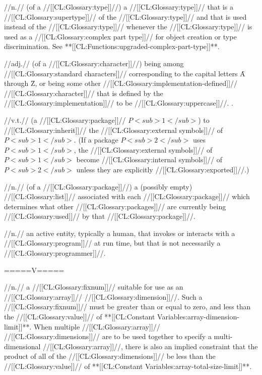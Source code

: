  //n.// (of a //[[CL:Glossary:type]]//) a //[[CL:Glossary:type]]// that is a //[[CL:Glossary:supertype]]// of the //[[CL:Glossary:type]]// and that is used instead of the //[[CL:Glossary:type]]// whenever the //[[CL:Glossary:type]]// is used as a //[[CL:Glossary:complex part type]]// for object creation or type discrimination. See **[[CL:Functions:upgraded-complex-part-type]]**.

 //adj.// (of a //[[CL:Glossary:character]]//) being among //[[CL:Glossary:standard characters]]// corresponding to the capital letters \f{A} through \f{Z}, or being some other //[[CL:Glossary:implementation-defined]]// //[[CL:Glossary:character]]// that is defined by the //[[CL:Glossary:implementation]]// to be //[[CL:Glossary:uppercase]]//. \Seesection\CharactersWithCase.

 //v.t.// (a //[[CL:Glossary:package]]// $P<sub>1</sub>$) to //[[CL:Glossary:inherit]]// the //[[CL:Glossary:external symbols]]// of $P<sub>1</sub>$. (If a package $P<sub>2</sub>$ uses $P<sub>1</sub>$, the //[[CL:Glossary:external symbols]]// of $P<sub>1</sub>$ become //[[CL:Glossary:internal symbols]]// of $P<sub>2</sub>$ unless they are explicitly //[[CL:Glossary:exported]]//.) 

 //n.// (of a //[[CL:Glossary:package]]//) a (possibly empty) //[[CL:Glossary:list]]// associated with each //[[CL:Glossary:package]]// which determines what other //[[CL:Glossary:packages]]// are currently being //[[CL:Glossary:used]]// by that //[[CL:Glossary:package]]//.

 //n.// an active entity, typically a human, that invokes or interacts with a //[[CL:Glossary:program]]// at run time, but that is not necessarily a //[[CL:Glossary:programmer]]//.

=====V=====
 
 //n.// a //[[CL:Glossary:fixnum]]// suitable for use as an //[[CL:Glossary:array]]// //[[CL:Glossary:dimension]]//. Such a //[[CL:Glossary:fixnum]]// must be greater than or equal to zero, and less than the //[[CL:Glossary:value]]// of **[[CL:Constant Variables:array-dimension-limit]]**. When multiple //[[CL:Glossary:array]]// //[[CL:Glossary:dimensions]]// are to be used together to specify a multi-dimensional //[[CL:Glossary:array]]//, there is also an implied constraint that the product of all of the //[[CL:Glossary:dimensions]]// be less than the //[[CL:Glossary:value]]// of **[[CL:Constant Variables:array-total-size-limit]]**.

